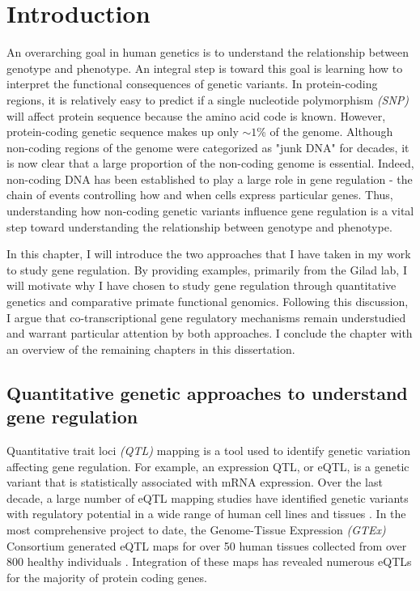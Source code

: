 \chapter{Introduction}

An overarching goal in human genetics is to understand the relationship between genotype and phenotype. An integral step is toward this goal is learning how to interpret the functional consequences of genetic variants. In protein-coding regions, it is relatively easy to predict if a single nucleotide polymorphism \emph{(SNP)} will affect protein sequence because the amino acid code is known. However, protein-coding genetic sequence makes up only $\sim1$\% of the genome. Although non-coding regions of the genome were categorized as "junk DNA" for decades, it is now clear that a large proportion of the non-coding genome is essential. Indeed, non-coding DNA has been established to play a large role in gene regulation - the chain of events controlling how and when cells express particular genes. Thus, understanding how non-coding genetic variants influence gene regulation is a vital step toward understanding the relationship between genotype and phenotype. 

In this chapter, I will introduce the two approaches that I have taken in my work to study gene regulation. By providing examples, primarily from the Gilad lab, I will motivate why I have chosen to study gene regulation through quantitative genetics and comparative primate functional genomics. Following this discussion, I argue that co-transcriptional gene regulatory mechanisms remain understudied and warrant particular attention by both approaches. I conclude the chapter with an overview of the remaining chapters in this dissertation.  


\section{Quantitative genetic approaches to understand gene regulation}

Quantitative trait loci \emph{(QTL)} mapping is a tool used to identify genetic variation affecting gene regulation. For example, an expression QTL, or eQTL, is a genetic variant that is statistically associated with mRNA expression.  Over the last decade, a large number of eQTL mapping studies have identified genetic variants with regulatory potential in a wide range of human cell lines and tissues \citep{lappalainen_transcriptome_2013, stranger_population_2007, stranger_population_2007, pickrell_understanding_2010, gtex_consortium_genetic_2017, schmiedel_impact_2018}. In the most comprehensive project to date, the Genome-Tissue Expression \emph{(GTEx)} Consortium generated eQTL maps for over 50 human tissues collected from over 800 healthy individuals \citep{ward_cracking_2017, aguet_gtex_2019, gtex_consortium_genetic_2017}. Integration of these maps has revealed numerous eQTLs for the majority of protein coding genes.  

